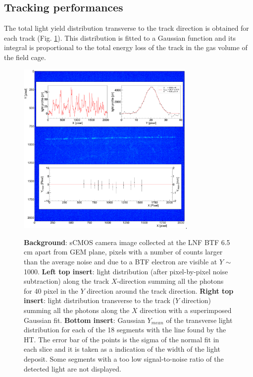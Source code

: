 \documentclass[%
 aip,
 amsmath,amssymb,
 reprint,%
]{revtex4-1}
\begin{document}
\subsection{Tracking performances}

 
 The total light  yield distribution transverse to the track direction is obtained for each track (Fig. \ref{fig:tracking}). This distribution is fitted to a Gaussian function  and its integral  is  proportional to the total energy loss of the track in the gas volume of the field cage. 
 
\begin{figure}[!ht]
\centering
\includegraphics[width=3.4in]{Fig5-Track-Z.pdf}\DeclareGraphicsExtensions.
\caption{{\bf Background}: sCMOS camera  image collected at the LNF BTF 6.5 cm apart from GEM plane, pixels with a number of counts larger than the average noise and due to a BTF electron are visible at $Y$ $\sim$ 1000. {\bf Left top insert}:  light distribution (after pixel-by-pixel noise subtraction) along the track $X$-direction summing all the photons for 40 pixel in the  $Y$ direction around the track direction. {\bf Right top insert}:    light distribution  transverse to the track ($Y$ direction) summing all the photons along the  $X$ direction  with a superimposed Gaussian fit. {\bf Bottom insert}: Gaussian $Y_{mean}$ of the transverse light distribution for each of the 18 segments with  the line found by the HT. The error bar of the points is the sigma of the normal fit in each slice and it is taken as a indication of the width of the light deposit. Some segments with a  too low signal-to-noise ratio of the detected light are not displayed. }
\label{fig:tracking}
\end{figure}
\end{document}
